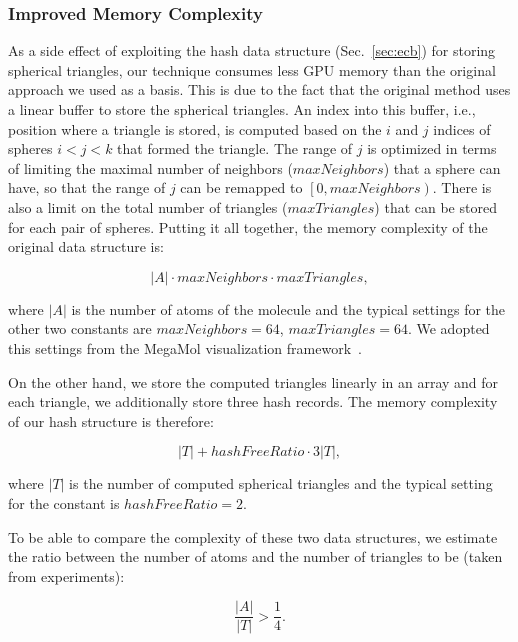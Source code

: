 \subsubsection{Improved Memory Complexity}

As a side effect of exploiting the hash data structure (Sec.~\ref{sec:ecb}) for storing spherical triangles, our technique consumes less GPU memory than the original approach we used as a basis.
This is due to the fact that the original method uses a linear buffer to store the spherical triangles.
An index into this buffer, i.e., position where a triangle is stored, is computed based on the $i$ and $j$ indices of spheres $i < j < k$ that formed the triangle.
The range of $j$ is optimized in terms of limiting the maximal number of neighbors ($maxNeighbors$) that a sphere can have, so that the range of $j$ can be remapped to $\left[0, maxNeighbors\right)$.
There is also a limit on the total number of triangles ($maxTriangles$) that can be stored for each pair of spheres.
Putting it all together, the memory complexity of the original data structure is:

\begin{equation}
|A| \cdot maxNeighbors \cdot maxTriangles,
\end{equation}

where $|A|$ is the number of atoms of the molecule and the typical settings for the other two constants are $maxNeighbors = 64$, $maxTriangles = 64$.
We adopted this settings from the MegaMol visualization framework~\cite{grottel2015megamol}.

On the other hand, we store the computed triangles linearly in an array and for each triangle, we additionally store three hash records. 
The memory complexity of our hash structure is therefore:

\begin{equation}
|T| + hashFreeRatio \cdot 3 |T|,
\end{equation}

where $|T|$ is the number of computed spherical triangles and the typical setting for the constant is $hashFreeRatio = 2$. 

To be able to compare the complexity of these two data structures, we estimate the ratio between the number of atoms and the number of triangles to be (taken from experiments):

\begin{equation}
\frac{|A|}{|T|} > \frac{1}{4}.
\end{equation}

